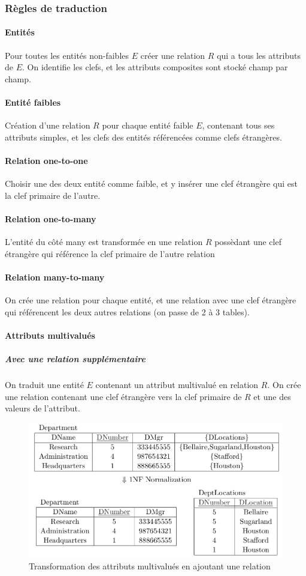 \documentclass[a4paper]{article}
\begin{document}
\subsubsection{Règles de traduction}
\paragraph{Entités}
Pour toutes les entités non-faibles $E$ créer une relation $R$ qui a tous les attributs
de $E$. On identifie les clefs, et les attributs composites sont stocké champ par champ.

\paragraph{Entité faibles}
Création d'une relation $R$ pour chaque entité faible $E$, contenant tous ses
attributs simples, et les clefs des entités référencées comme clefs étrangères.

\paragraph{Relation one-to-one}
Choisir une des deux entité comme faible, et y insérer une clef étrangère qui
est la clef primaire de l'autre.

\paragraph{Relation one-to-many}
L'entité du côté many est transformée en une relation $R$ possèdant une clef étrangère
qui référence la clef primaire de l'autre relation

\paragraph{Relation many-to-many}
On crée une relation pour chaque entité, et une relation avec une clef étrangère
qui référencent les deux autres relations (on passe de 2 à 3 tables).

\paragraph{Attributs multivalués}
\subparagraph{Avec une relation supplémentaire}
On traduit une entité $E$ contenant un attribut multivalué en relation $R$.
On crée une relation contenant une clef étrangère vers la clef primaire de $R$ et
une des valeurs de l'attribut.
\begin{figure}[H]
    \center
    \includegraphics[width=.7\textwidth]{fig/multiattrs-1nf.png}
    \caption{Transformation des attributs multivalués en ajoutant une relation}
\end{figure}
\end{document}
